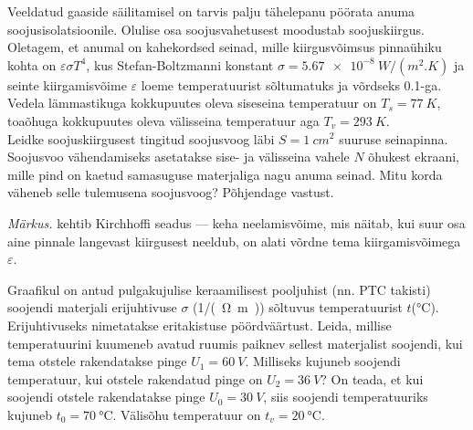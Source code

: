 \documentclass[10pt]{article}
\begin{document}
{%

Veeldatud gaaside säilitamisel on tarvis palju tähelepanu pöörata anuma soojusisolatsioonile. Olulise osa soojusvahetusest moodustab soojuskiirgus. Oletagem, et anumal on kahekordsed seinad, mille kiirgusvõimsus pinnaühiku kohta on $\varepsilon \sigma T^4$, kus Stefan-Boltzmanni konstant $\sigma = \SI{5,67e-8}{W/(m^2.K)}$ ja seinte kiirgamisvõime $\varepsilon$ loeme temperatuurist sõltumatuks ja võrdseks \num{0,1}-ga. Vedela lämmastikuga kokkupuutes oleva siseseina temperatuur on $T_s = \SI{77}{K}$, toaõhuga kokkupuutes oleva välisseina temperatuur aga $T_v = \SI{293}{K}$.\\
\osa Leidke soojuskiirgusest tingitud soojusvoog läbi $S = \SI{1}{cm^2}$ suuruse seinapinna.\\
\osa Soojusvoo vähendamiseks asetatakse sise- ja välisseina vahele $N$ õhukest ekraani, mille pind on kaetud samasuguse materjaliga nagu anuma seinad. Mitu korda väheneb selle tulemusena soojusvoog? Põhjendage vastust.

\emph{Märkus.} kehtib Kirchhoffi seadus --- keha neelamisvõime, mis näitab, kui suur osa aine pinnale langevast kiirgusest neeldub, on alati võrdne tema kiirgamisvõimega $\varepsilon$.\\
\probend
\bigskip


Graafikul on antud pulgakujulise keraamilisest pooljuhist (nn. PTC takisti) soojendi materjali erijuhtivuse $\sigma$ (\si{1/(\ohm. m)}) sõltuvus temperatuurist $t$(\si{\degreeCelsius}). Erijuhtivuseks nimetatakse eritakistuse pöördväärtust. Leida, millise temperatuurini kuumeneb avatud ruumis paiknev sellest materjalist soojendi, kui tema otstele rakendatakse pinge $U_1 = \SI{60}{V}$. Milliseks kujuneb soojendi temperatuur, kui otstele rakendatud pinge on $U_2 = \SI{36}{V}$? On teada, et kui soojendi otstele rakendatakse pinge $U_0 = \SI{30}{V}$, siis soojendi temperatuuriks kujuneb $t_0= \SI{70}{\degreeCelsius}$. Välisõhu temperatuur on $t_v = \SI{20}{\degreeCelsius}$.

}
\end{document}
